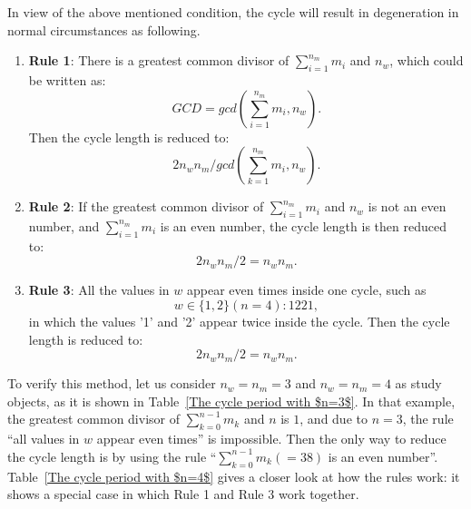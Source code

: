 In view of the above mentioned condition, the cycle will result in degeneration in normal circumstances as following. 

\begin{enumerate}
\item{\textbf{Rule 1}:} There is a greatest common divisor of $\sum_{i=1}^{n_m}m_i$ and $n_w$, which could be written as:
$$GCD=gcd(\sum_{i=1}^{n_m}m_i,n_w).$$
Then the cycle length is reduced to:
$$2n_wn_m/gcd(\sum_{k=1}^{n_m}m_i,n_w).$$
\item{\textbf{Rule 2}:} If the greatest common divisor of $\sum_{i=1}^{n_m}m_i$ and $n_w$ is not an even number, and $\sum_{i=1}^{n_m}m_i$ is an even number, the cycle length is then reduced to:
$$2n_wn_m/2=n_wn_m.$$
 \item{\textbf{Rule 3}:} All the  values in $w$ appear even times inside one cycle, such as
$$  w \in \{1,2\} (n=4):1221,$$ 
in which the values '1' and '2' appear twice inside the cycle. Then the cycle length is reduced to:
$$2n_wn_m/2=n_wn_m.$$
\end{enumerate}

To verify this method, let us consider $n_w=n_m=3$ and $n_w=n_m=4$ as study objects, as it is shown in Table~\ref{The cycle period with $n=3$}.
In that example, the greatest common divisor of $\sum_{k=0}^{n-1}m_k$ and $n$ is $1$, and due to $n=3$, the rule ``all values in $w$ appear even times'' is impossible. Then the only way to reduce the cycle length is by using the rule ``$\sum_{k=0}^{n-1} m_k (=38)$ is an even number''. Table~\ref{The cycle period with $n=4$} gives a closer look at how the rules work: it shows a special case in which Rule 1 and Rule 3 work together.


